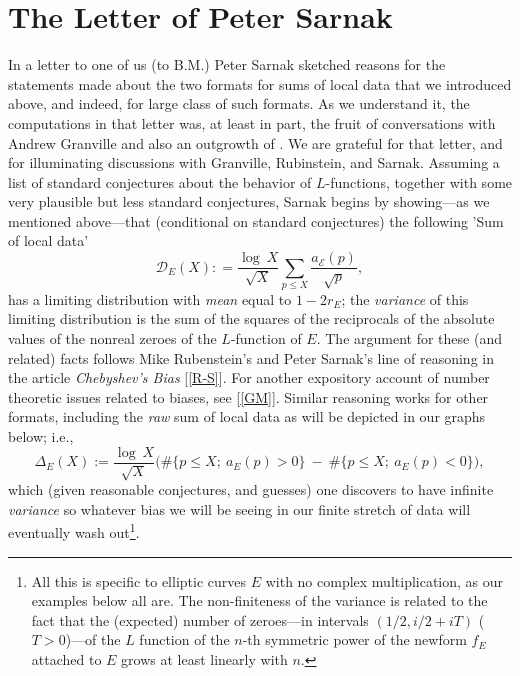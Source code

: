 \documentclass[11pt]{article}
\theoremstyle{plain}
\theoremstyle{definition}
\numberwithin{equation}{section}
\numberwithin{figure}{section}
\numberwithin{table}{section}
\begin{document}
\section{The Letter of Peter Sarnak}  In a letter  \cite{S}  to one of us (to B.M.) Peter Sarnak sketched reasons for the statements made about the two formats for sums of local data that we  introduced above, and indeed, for large class of such formats. As we  understand it, the computations in that letter was, at least in part, the fruit of conversations with Andrew Granville and also an outgrowth of \cite{R-S}. We are grateful for that letter, and for  illuminating discussions with    Granville, Rubinstein, and Sarnak.  Assuming a list of standard conjectures about the behavior of $L$-functions, together with some very plausible but less standard conjectures, Sarnak begins by showing---as we mentioned above---that (conditional on standard conjectures)  the following  'Sum of local data'   $$ {\mathcal D}_E(X): = {\frac{\log\ X}{\sqrt X}}\sum_{p \le X}{\frac{a_{\mathcal E}(p)}{\sqrt p}},$$ has a limiting distribution with {\it mean} equal to $1- 2r_E$; the {\it variance} of this limiting distribution  is the sum of the squares of the reciprocals of the absolute values of the nonreal zeroes of the $L$-function of $E$. The argument for these (and related) facts follows Mike Rubenstein's and Peter Sarnak's line of reasoning in the article {\it Chebyshev's Bias} [\ref{R-S}]. For another expository account of number theoretic issues related to biases, see [\ref{GM}]. Similar reasoning works for other formats, including the {\it raw} sum of local data as will be depicted in our graphs below; i.e.,  $$\Delta_E(X):= {\frac{\log\ X}{\sqrt X}}\big(\#\{ {p \le X};\ a_E(p) > 0\} \ - \ \#\{ {p \le X};\ a_E(p) < 0\}\big),$$ which  (given reasonable conjectures, and guesses)  one discovers to have infinite {\it variance} so whatever bias we will be seeing in our finite stretch of data will eventually wash out{\footnote{ All this is specific to elliptic curves $E$ with no complex multiplication, as our examples below all are. The non-finiteness of the variance is related to the fact that the (expected) number of  zeroes---in  intervals  $(1/2, i/2+iT)$ ($T > 0$)---of the $L$ function of the $n$-th symmetric power of the newform $f_E$ attached to  $E$   grows at least linearly with $n$.}}.





\end{document}
